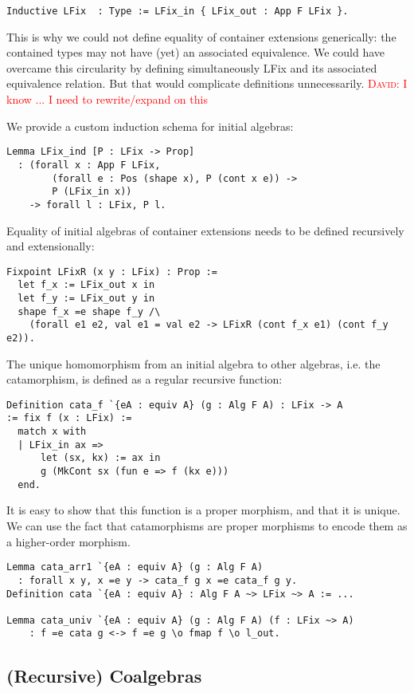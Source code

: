 \documentclass[a4paper, UKenglish, cleveref, autoref, thm-restate]{lipics-v2021}
\newcommand{\dcas}[1]{\textcolor{red}{\textsc{David}: #1}}
\begin{document}
\begin{verbatim}
Inductive LFix  : Type := LFix_in { LFix_out : App F LFix }.
\end{verbatim}
This is why we could not define equality of container extensions generically:
the contained types may not have (yet) an associated equivalence. We could have
overcame this circularity by defining simultaneously LFix and its associated
equivalence relation. But that would complicate definitions unnecessarily.
\dcas{I know ... I need to rewrite/expand on this}

We provide a custom induction schema for initial algebras:

\begin{verbatim}
Lemma LFix_ind [P : LFix -> Prop]
  : (forall x : App F LFix,
        (forall e : Pos (shape x), P (cont x e)) ->
        P (LFix_in x))
    -> forall l : LFix, P l.
\end{verbatim}

Equality of initial algebras of container extensions needs to be defined
recursively and extensionally:
\begin{verbatim}
Fixpoint LFixR (x y : LFix) : Prop :=
  let f_x := LFix_out x in
  let f_y := LFix_out y in
  shape f_x =e shape f_y /\
    (forall e1 e2, val e1 = val e2 -> LFixR (cont f_x e1) (cont f_y e2)).
\end{verbatim}

The unique homomorphism from an initial algebra to other algebras, i.e. the catamorphism, is defined as a
regular recursive function:
\begin{verbatim}
Definition cata_f `{eA : equiv A} (g : Alg F A) : LFix -> A
:= fix f (x : LFix) :=
  match x with
  | LFix_in ax =>
      let (sx, kx) := ax in
      g (MkCont sx (fun e => f (kx e)))
  end.
\end{verbatim}

It is easy to show that this function is a proper morphism, and that it is
unique. We can use the fact that catamorphisms are proper morphisms to encode
them as a higher-order morphism.
\begin{verbatim}
Lemma cata_arr1 `{eA : equiv A} (g : Alg F A)
  : forall x y, x =e y -> cata_f g x =e cata_f g y.
Definition cata `{eA : equiv A} : Alg F A ~> LFix ~> A := ...

Lemma cata_univ `{eA : equiv A} (g : Alg F A) (f : LFix ~> A)
    : f =e cata g <-> f =e g \o fmap f \o l_out.
\end{verbatim}

\subsection{(Recursive) Coalgebras}
\end{document}
